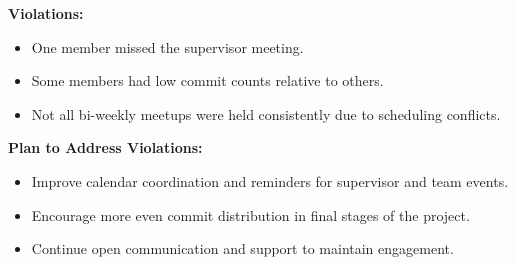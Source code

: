 \documentclass{article}
\begin{document}
\textbf{Violations:}
\begin{itemize}
  \item One member missed the supervisor meeting.
  \item Some members had low commit counts relative to others.
  \item Not all bi-weekly meetups were held consistently due to scheduling conflicts.
\end{itemize}

\textbf{Plan to Address Violations:}
\begin{itemize}
  \item Improve calendar coordination and reminders for supervisor and team events.
  \item Encourage more even commit distribution in final stages of the project.
  \item Continue open communication and support to maintain engagement.
\end{itemize}


\end{document}
